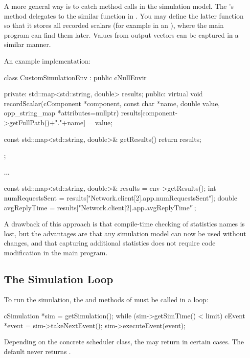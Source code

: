 A more general way is to catch  method calls in the
simulation model. The 's  method
delegates to the similar function in . You may define the
latter function so that it stores all recorded scalars (for example in an
), where the main program can find them later.
Values from output vectors can be captured in a similar manner.

An example implementation:

\begin{cpp}
class CustomSimulationEnv : public cNullEnvir
{
  private:
    std::map<std::string, double> results;
  public:
    virtual void recordScalar(cComponent *component, const char *name,
                              double value, opp_string_map *attributes=nullptr)
    {
       results[component->getFullPath()+"."+name] = value;
    }

    const std::map<std::string, double>& getResults() {return results;}
};

...

const std::map<std::string, double>& results = env->getResults();
int numRequestsSent = results["Network.client[2].app.numRequestsSent"];
double avgReplyTime = results["Network.client[2].app.avgReplyTime"];
\end{cpp}

A drawback of this approach is that compile-time checking of statistics names is lost, but
the advantages are that any simulation model can now be used
without changes, and that capturing additional statistics does not require
code modification in the main program.


\subsection{The Simulation Loop}
\label{sec:embedding:simulation-loop}

To run the simulation, the  and 
methods of  must be called in a loop:

\begin{cpp}
cSimulation *sim = getSimulation();
while (sim->getSimTime() < limit) {
    cEvent *event = sim->takeNextEvent();
    sim->executeEvent(event);
}
\end{cpp}

Depending on the concrete scheduler class, the  
may return  in certain cases. The default
 never returns .

